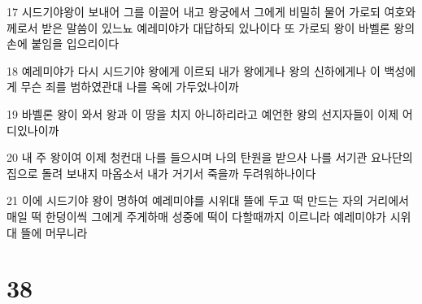 \par 17 시드기야왕이 보내어 그를 이끌어 내고 왕궁에서 그에게 비밀히 물어 가로되 여호와께로서 받은 말씀이 있느뇨 예레미야가 대답하되 있나이다 또 가로되 왕이 바벨론 왕의 손에 붙임을 입으리이다
\par 18 예레미야가 다시 시드기야 왕에게 이르되 내가 왕에게나 왕의 신하에게나 이 백성에게 무슨 죄를 범하였관대 나를 옥에 가두었나이까
\par 19 바벨론 왕이 와서 왕과 이 땅을 치지 아니하리라고 예언한 왕의 선지자들이 이제 어디있나이까
\par 20 내 주 왕이여 이제 청컨대 나를 들으시며 나의 탄원을 받으사 나를 서기관 요나단의 집으로 돌려 보내지 마옵소서 내가 거기서 죽을까 두려워하나이다
\par 21 이에 시드기야 왕이 명하여 예레미야를 시위대 뜰에 두고 떡 만드는 자의 거리에서 매일 떡 한덩이씩 그에게 주게하매 성중에 떡이 다할때까지 이르니라 예레미야가 시위대 뜰에 머무니라

\chapter{38}

